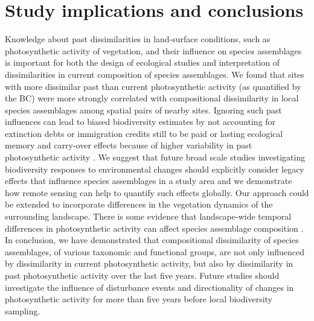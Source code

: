 \section{Study implications and conclusions}
\label{C02_05}
Knowledge about past dissimilarities in land-surface conditions, such as photosynthetic activity of vegetation, and their influence on species assemblages is important for both the design of ecological studies and interpretation of dissimilarities in current composition of species assemblages. We found that sites with more dissimilar past than current photosynthetic activity (as quantified by the BC) were more strongly correlated with compositional dissimilarity in local species assemblages among spatial pairs of nearby sites. Ignoring such past influences can lead to biased biodiversity estimates by not accounting for extinction debts or immigration credits still to be paid \citep[see ][]{Tilman1994} or lasting ecological memory and carry-over effects because of higher variability in past photosynthetic activity \citep{Rowhani2008,Cole2015,Ogle2015}. We suggest that future broad scale studies investigating biodiversity responses to environmental changes should explicitly consider legacy effects that influence species assemblages in a study area and we demonstrate how remote sensing can help to quantify such effects globally. Our approach could be extended to incorporate differences in the vegetation dynamics of the surrounding landscape. There is some evidence that landscape-wide temporal differences in photosynthetic activity can affect species assemblage composition \citep{Manning2009,Fernandez2016}. In conclusion, we have demonstrated that compositional dissimilarity of species assemblages, of various taxonomic and functional groups, are not only influenced by dissimilarity in current photosynthetic activity, but also by dissimilarity in past photosynthetic activity over the last five years. Future studies should investigate the influence of disturbance events and directionality of changes in photosynthetic activity for more than five years before local biodiversity sampling.


